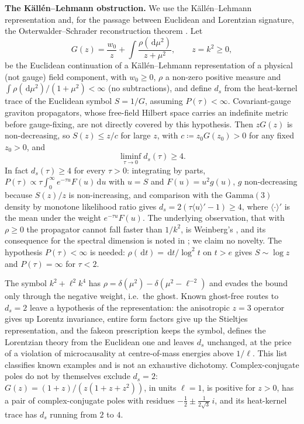 \documentclass[11pt,a4paper,reqno]{amsart}
\theoremstyle{definition}
\numberwithin{equation}{section}
\newcommand{\dif}{\,\mathrm{d}}
\begin{document}
\textbf{The K\"all\'en--Lehmann obstruction.} We use the K\"all\'en--Lehmann representation \cite{Kallen1952, Lehmann1954} and, for the passage between Euclidean and Lorentzian signature, the Osterwalder--Schrader reconstruction theorem \cite{OS1973}. Let
\begin{equation}
    \label{eq:kl_representation}
    G(z) = \frac{w_0}{z} + \int \frac{\rho(\dif \mu^2)}{z + \mu^2}, \qquad z = k^2 \ge 0,
\end{equation}
be the Euclidean continuation of a K\"all\'en--Lehmann representation of a physical (not gauge) field component, with $w_0 \ge 0$, $\rho$ a non-zero positive measure and $\int \rho(\dif\mu^2)/(1+\mu^2) < \infty$ (no subtractions), and define $d_s$ from the heat-kernel trace of the Euclidean symbol $S = 1/G$, assuming $P(\tau) < \infty$. Covariant-gauge graviton propagators, whose free-field Hilbert space carries an indefinite metric before gauge-fixing, are not directly covered by this hypothesis. Then $zG(z)$ is non-decreasing, so $S(z) \le z/c$ for large $z$, with $c \coloneqq z_0G(z_0) > 0$ for any fixed $z_0 > 0$, and
\begin{equation}
    \label{eq:kl_bound}
    \liminf_{\tau \to 0} d_s(\tau) \ge 4.
\end{equation}
In fact $d_s(\tau) \ge 4$ for every $\tau > 0$: integrating by parts, $P(\tau) \propto \tau\int_0^\infty e^{-\tau u} F(u)\dif u$ with $u = S$ and $F(u) = u^2 g(u)$, $g$ non-decreasing because $S(z)/z$ is non-increasing, and comparison with the $\mathrm{Gamma}(3)$ density by monotone likelihood ratio gives $d_s = 2(\tau\langle u\rangle' - 1) \ge 4$, where $\langle\cdot\rangle'$ is the mean under the weight $e^{-\tau u}F(u)$. The underlying observation, that with $\rho \ge 0$ the propagator cannot fall faster than $1/k^2$, is Weinberg's \cite[\S10.7]{Weinberg1995}, and its consequence for the spectral dimension is noted in \cite[\S IV]{BBMM2016}; we claim no novelty. The hypothesis $P(\tau) < \infty$ is needed: $\rho(\dif t) = \dif t/\log^2 t$ on $t > e$ gives $S \sim \log z$ and $P(\tau) = \infty$ for $\tau < 2$.

The symbol $k^2 + \ell^2 k^4$ has $\rho = \delta(\mu^2) - \delta(\mu^2 - \ell^{-2})$ and evades the bound only through the negative weight, i.e.\ the ghost. Known ghost-free routes to $d_s = 2$ leave a hypothesis of the representation: the anisotropic $z = 3$ operator gives up Lorentz invariance, entire form factors give up the Stieltjes representation, and the fakeon prescription \cite{AnselmiPiva2018} keeps the symbol, defines the Lorentzian theory from the Euclidean one and leaves $d_s$ unchanged, at the price of a violation of microcausality at centre-of-mass energies above $1/\ell$. This list classifies known examples and is not an exhaustive dichotomy. Complex-conjugate poles do not by themselves exclude $d_s = 2$: $G(z) = (1+z)/(z(1+z+z^2))$, in units $\ell = 1$, is positive for $z > 0$, has a pair of complex-conjugate poles with residues $-\tfrac12 \pm \tfrac{1}{2\sqrt3}\,i$, and its heat-kernel trace has $d_s$ running from $2$ to $4$.
\end{document}

